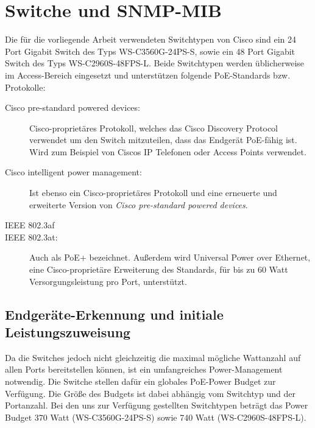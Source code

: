 \section{Switche und SNMP-MIB}
\label{sec:cisco}

Die f\"ur die vorliegende Arbeit verwendeten Switchtypen von Cisco sind ein 24 Port Gigabit Switch des Typs WS-C3560G-24PS-S, sowie ein 48 Port Gigabit Switch des Typs WS-C2960S-48FPS-L. Beide Switchtypen werden \"ublicherweise im Access-Bereich eingesetzt und unterst\"utzen folgende PoE-Standards bzw. Protokolle:
\begin{description}
\item[Cisco pre-standard powered devices:] Cisco-propriet\"ares Protokoll, welches das Cisco Discovery Protocol verwendet um den Switch mitzuteilen, dass das Endger\"at PoE-f\"ahig ist. Wird zum Beispiel von Ciscos IP Telefonen oder Access Points verwendet.
\item[Cisco intelligent power management:] Ist ebenso ein Cisco-propriet\"ares Protokoll und eine erneuerte und erweiterte Version von \emph{Cisco pre-standard powered devices}.
\item[IEEE 802.3af]
\item[IEEE 802.3at:] Auch als PoE+ bezeichnet. Au{\ss}erdem wird Universal Power over Ethernet, eine Cisco-propriet\"are Erweiterung des Standards, f\"ur bis zu 60 Watt Versorgungsleistung pro Port, unterst\"utzt.
\end{description}

\subsection{Endger\"ate-Erkennung und initiale Leistungszuweisung}
Da die Switches jedoch nicht gleichzeitig die maximal m\"ogliche Wattanzahl auf allen Ports bereitstellen k\"onnen, ist ein umfangreiches Power-Management notwendig. Die Switche stellen daf\"ur ein globales PoE-Power Budget zur Verf\"ugung. Die Gr\"o{\ss}e des Budgets ist dabei abh\"angig vom Switchtyp und der Portanzahl. Bei den uns zur Verf\"ugung gestellten Switchtypen betr\"agt das Power Budget 370 Watt (WS-C3560G-24PS-S)\cite{cisco-c3560g-datasheet} sowie 740 Watt (WS-C2960S-48FPS-L)\cite{cisco-c2960s-datasheet}.

